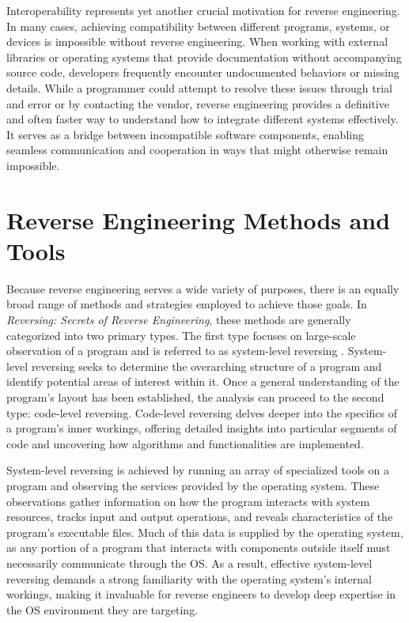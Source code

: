 Interoperability represents yet another crucial motivation for reverse engineering. In many cases, achieving compatibility between different programs, systems, or devices is impossible without reverse engineering. When working with external libraries or operating systems that provide documentation without accompanying source code, developers frequently encounter undocumented behaviors or missing details. While a programmer could attempt to resolve these issues through trial and error or by contacting the vendor, reverse engineering provides a definitive and often faster way to understand how to integrate different systems effectively. It serves as a bridge between incompatible software components, enabling seamless communication and cooperation in ways that might otherwise remain impossible.

\section{Reverse Engineering Methods and Tools}

Because reverse engineering serves a wide variety of purposes, there is an equally broad range of methods and strategies employed to achieve those goals. In \textit{Reversing: Secrets of Reverse Engineering}, these methods are generally categorized into two primary types. The first type focuses on large-scale observation of a program and is referred to as system-level reversing \cite{Reversing}. System-level reversing seeks to determine the overarching structure of a program and identify potential areas of interest within it. Once a general understanding of the program’s layout has been established, the analysis can proceed to the second type: code-level reversing. Code-level reversing delves deeper into the specifics of a program’s inner workings, offering detailed insights into particular segments of code and uncovering how algorithms and functionalities are implemented.

System-level reversing is achieved by running an array of specialized tools on a program and observing the services provided by the operating system. These observations gather information on how the program interacts with system resources, tracks input and output operations, and reveals characteristics of the program’s executable files. Much of this data is supplied by the operating system, as any portion of a program that interacts with components outside itself must necessarily communicate through the OS. As a result, effective system-level reversing demands a strong familiarity with the operating system’s internal workings, making it invaluable for reverse engineers to develop deep expertise in the OS environment they are targeting.

